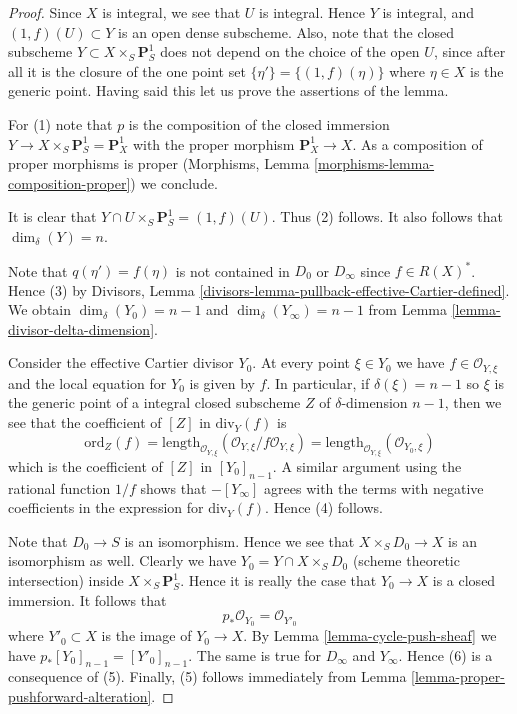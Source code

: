 \begin{proof}
Since $X$ is integral, we see that $U$ is integral.
Hence $Y$ is integral, and $(1, f)(U) \subset Y$ is an open dense subscheme.
Also, note that the closed subscheme $Y \subset X \times_S \mathbf{P}^1_S$
does not depend on the choice of the open $U$, since after all it is
the closure of the one point set $\{\eta'\} = \{(1, f)(\eta)\}$
where $\eta \in X$ is the generic point. Having said this let us
prove the assertions of the lemma.

\medskip\noindent
For (1) note that $p$ is the composition of the closed immersion
$Y \to X \times_S \mathbf{P}^1_S = \mathbf{P}^1_X$ with the proper
morphism $\mathbf{P}^1_X \to X$. As a composition of proper morphisms
is proper (Morphisms, Lemma \ref{morphisms-lemma-composition-proper})
we conclude.

\medskip\noindent
It is clear that $Y \cap U \times_S \mathbf{P}^1_S = (1, f)(U)$.
Thus (2) follows. It also follows that $\dim_\delta(Y) = n$.

\medskip\noindent
Note that $q(\eta') = f(\eta)$ is not contained in $D_0$ or $D_\infty$
since $f \in R(X)^*$. Hence (3) by
Divisors, Lemma \ref{divisors-lemma-pullback-effective-Cartier-defined}.
We obtain $\dim_\delta(Y_0) = n - 1$
and $\dim_\delta(Y_\infty) = n - 1$ from
Lemma \ref{lemma-divisor-delta-dimension}.

\medskip\noindent
Consider the effective Cartier divisor $Y_0$.
At every point $\xi \in Y_0$ we have $f \in \mathcal{O}_{Y, \xi}$ and
the local equation for $Y_0$ is given by $f$.
In particular, if $\delta(\xi) = n - 1$ so $\xi$ is the generic point
of a integral closed subscheme $Z$ of $\delta$-dimension $n - 1$,
then we see that the coefficient of $[Z]$ in $\text{div}_Y(f)$ is
$$
\text{ord}_Z(f) =
\text{length}_{\mathcal{O}_{Y, \xi}}
(\mathcal{O}_{Y, \xi}/f\mathcal{O}_{Y, \xi}) =
\text{length}_{\mathcal{O}_{Y, \xi}}
(\mathcal{O}_{Y_0, \xi})
$$
which is the coefficient of $[Z]$ in $[Y_0]_{n - 1}$. A similar
argument using the rational function $1/f$ shows that
$-[Y_\infty]$ agrees with the terms with negative coefficients in
the expression for $\text{div}_Y(f)$. Hence (4) follows.

\medskip\noindent
Note that $D_0 \to S$ is an isomorphism. Hence we see that
$X \times_S D_0 \to X$ is an isomorphism as well. Clearly
we have $Y_0 = Y \cap X \times_S D_0$ (scheme theoretic intersection)
inside $X \times_S \mathbf{P}^1_S$. Hence it is really the case that
$Y_0 \to X$ is a closed immersion. It follows that
$$
p_*\mathcal{O}_{Y_0} = \mathcal{O}_{Y'_0}
$$
where $Y'_0 \subset X$ is the image of $Y_0 \to X$.
By Lemma \ref{lemma-cycle-push-sheaf} we
have $p_*[Y_0]_{n - 1} = [Y'_0]_{n - 1}$. The same
is true for $D_\infty$ and $Y_\infty$. Hence (6) is a consequence of (5).
Finally, (5) follows immediately from
Lemma \ref{lemma-proper-pushforward-alteration}.
\end{proof}

